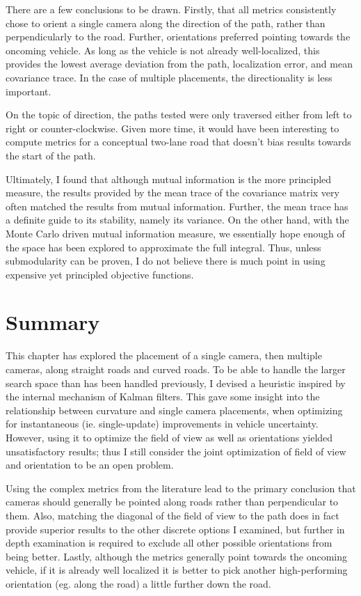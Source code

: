 \documentclass[a4paper,12pt,twoside,openright]{report}
\begin{document}
There are a few conclusions to be drawn. Firstly, that all metrics
consistently chose to orient a single camera along the direction of the path, rather
than perpendicularly to the road. Further, orientations
preferred pointing towards the oncoming vehicle. As long as the vehicle is not
already well-localized, this provides the lowest average deviation
from the path, localization error, and mean covariance trace. In the case
of multiple placements, the directionality is less important.

On the topic of direction, the paths tested were only traversed
either from left to right or counter-clockwise. Given more time,
it would have been interesting to compute metrics for a conceptual
two-lane road that doesn't bias results towards the start
of the path.

Ultimately, I found that although mutual information is the more
principled measure, the results provided by the mean trace of the
covariance matrix very often matched the results from mutual information.
Further, the mean trace has a definite guide to its stability, namely
its variance. On the other hand, with the Monte Carlo driven mutual
information measure, we essentially hope enough of the space
has been explored to approximate the full integral. Thus,
unless submodularity can be proven, I do not believe
there is much point in using expensive yet principled objective functions.


\section{Summary}

This chapter has explored the placement of a single camera, then multiple cameras,
along straight roads and curved roads. To be able to handle
the larger search space than has been handled previously, I devised a
heuristic inspired by the internal mechanism of Kalman filters. This
gave some insight into the relationship between curvature and single camera placements,
when optimizing for instantaneous (ie. single-update) improvements in 
vehicle uncertainty. However, using it to optimize the field of view
as well as orientations yielded unsatisfactory results; thus I still consider
the joint optimization of field of view and orientation to be
an open problem. 

Using the complex metrics from the literature lead to the primary conclusion 
that cameras should generally be pointed along roads rather than
perpendicular to them. Also, matching the diagonal of the field of view 
to the path does in fact provide superior results to the other discrete options I examined,
but further in depth examination is required to exclude all other possible
orientations from being better. Lastly, although the metrics
generally point towards the oncoming vehicle, if it is already well localized
it is better to pick another high-performing orientation (eg. along the road)
a little further down the road.
\end{document}
